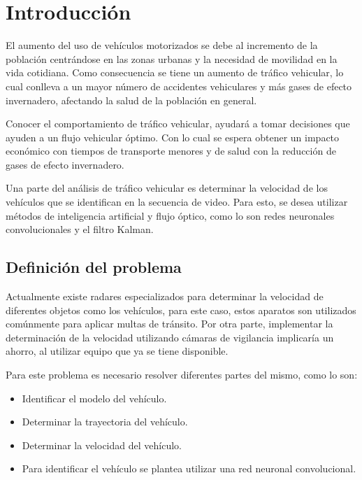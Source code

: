 

\chapter{Introducción}

El aumento del uso de vehículos motorizados se debe al incremento de la población centrándose en las zonas urbanas y la necesidad de movilidad en la vida cotidiana. Como consecuencia se tiene un aumento de tráfico vehicular, lo cual conlleva a un mayor número de accidentes vehiculares y más gases de efecto invernadero, afectando la salud de la población en general.

Conocer el comportamiento de tráfico vehicular, ayudará a tomar decisiones que ayuden a un flujo vehicular óptimo. Con lo cual se espera obtener un impacto económico con tiempos de transporte menores y de salud con la reducción de gases de efecto invernadero.

Una parte del análisis de tráfico vehicular es determinar la velocidad de los vehículos que se identifican en la secuencia de video. Para esto, se desea utilizar métodos de inteligencia artificial y flujo óptico, como lo son redes neuronales convolucionales y el filtro Kalman.

\section{Definición del problema}

Actualmente existe radares especializados para determinar la velocidad de diferentes objetos como los vehículos, para este caso, estos aparatos son utilizados comúnmente para aplicar multas de tránsito. Por otra parte, implementar la determinación de la velocidad utilizando cámaras de vigilancia implicaría un ahorro, al utilizar equipo que ya se tiene disponible.

Para este problema es necesario resolver diferentes partes del mismo, como lo son:

\begin{itemize}
\item Identificar el modelo del vehículo.
\item Determinar la trayectoria del vehículo.
\item Determinar la velocidad del vehículo.
\item Para identificar el vehículo se plantea utilizar una red neuronal convolucional.
\end{itemize}

